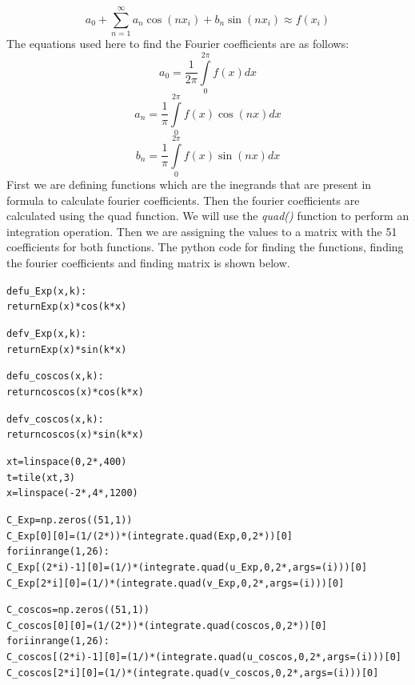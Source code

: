 \documentclass[11pt, a4paper]{article}
\begin{document}
\begin{equation}
    a_{0} + \sum\limits_{n=1}^{\infty} {{a_{n}\cos(nx_{i})+b_{n}\sin(nx_{i})}} \approx f(x_{i}) 
    \end{equation}
    	The equations used here to find the Fourier coefficients are as follows:
    \begin{equation}
         a_{0} = \frac{1}{2\pi}\int\limits_{0}^{2\pi} f(x)dx  
    \end{equation}
    \begin{equation}
         a_{n} = \frac{1}{\pi}\int\limits_{0}^{2\pi} f(x)\cos(nx)dx 
    \end{equation}
    \begin{equation}
         b_{n} = \frac{1}{\pi}\int\limits_{0}^{2\pi} f(x)\sin(nx)dx 
    \end{equation}
First we are defining functions which are the inegrands that are present in formula to calculate fourier coefficients. Then the fourier coefficients are calculated using the quad function. We will use the \textit{quad()} function to perform an integration operation. Then we are assigning the values to a matrix with the 51 coefficients for both functions. The python code for finding the functions, finding the fourier coefficients and finding matrix is shown below. 
\begin{alltt}

def u_Exp(x, k):              
    return Exp(x) * cos(k*x)  

def v_Exp(x, k):              
    return Exp(x) * sin(k*x)  

def u_coscos(x, k):             
    return coscos(x) * cos(k*x) 

def v_coscos(x, k):             
    return coscos(x) * sin(k*x) 
	
xt = linspace(0, 2*\pi, 400) 
t = tile(xt, 3)
x = linspace(-2*\pi, 4*\pi, 1200)	

C_Exp = np.zeros((51, 1))	
C_Exp[0][0] = (1/(2*\pi))*(integrate.quad(Exp, 0, 2*\pi))[0] 	
for i in range(1, 26):	
	C_Exp[(2*i)-1][0] = (1/\pi)*(integrate.quad(u_Exp, 0, 2*\pi, args=(i)))[0]  
	C_Exp[2*i][0] = (1/\pi)*(integrate.quad(v_Exp, 0, 2*\pi, args=(i)))[0]

C_coscos = np.zeros((51,1))							
C_coscos[0][0] = (1/(2*\pi))*(integrate.quad(coscos, 0, 2*\pi))[0] 
for i in range(1,26):																	
	C_coscos[(2*i)-1][0] = (1/\pi)*(integrate.quad(u_coscos, 0, 2*\pi, args=(i)))[0]	
	C_coscos[2*i][0] = (1/\pi)*(integrate.quad(v_coscos, 0, 2*\pi, args=(i)))[0]
\end{alltt}
\end{document}
